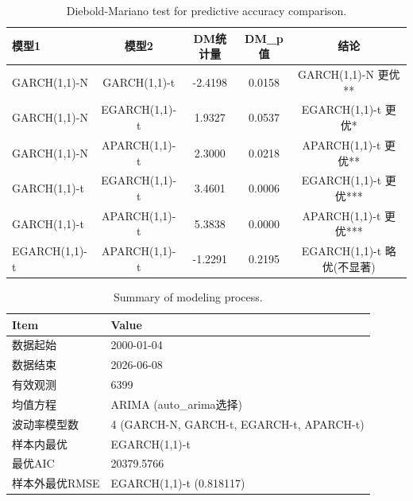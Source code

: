 \begin{table}[htbp]
  \centering
  \caption{Diebold-Mariano test for predictive accuracy comparison.}
  \label{tab:dm_test}
  \begin{tabular}{lcccc}
    \toprule
    模型1 & 模型2 & DM统计量 & DM_p值 & 结论 \\
    \midrule
    GARCH(1,1)-N & GARCH(1,1)-t & -2.4198 & 0.0158 & GARCH(1,1)-N 更优** \\
    GARCH(1,1)-N & EGARCH(1,1)-t & 1.9327 & 0.0537 & EGARCH(1,1)-t 更优* \\
    GARCH(1,1)-N & APARCH(1,1)-t & 2.3000 & 0.0218 & APARCH(1,1)-t 更优** \\
    GARCH(1,1)-t & EGARCH(1,1)-t & 3.4601 & 0.0006 & EGARCH(1,1)-t 更优*** \\
    GARCH(1,1)-t & APARCH(1,1)-t & 5.3838 & 0.0000 & APARCH(1,1)-t 更优*** \\
    EGARCH(1,1)-t & APARCH(1,1)-t & -1.2291 & 0.2195 & EGARCH(1,1)-t 略优(不显著) \\
    \bottomrule
  \end{tabular}
\end{table}

\begin{table}[htbp]
  \centering
  \caption{Summary of modeling process.}
  \label{tab:summary}
  \begin{tabular}{ll}
    \toprule
    Item & Value \\
    \midrule
    数据起始 & 2000-01-04 \\
    数据结束 & 2026-06-08 \\
    有效观测 & 6399 \\
    均值方程 & ARIMA (auto_arima选择) \\
    波动率模型数 & 4 (GARCH-N, GARCH-t, EGARCH-t, APARCH-t) \\
    样本内最优 & EGARCH(1,1)-t \\
    最优AIC & 20379.5766 \\
    样本外最优RMSE & EGARCH(1,1)-t (0.818117) \\
    \bottomrule
  \end{tabular}
\end{table}
